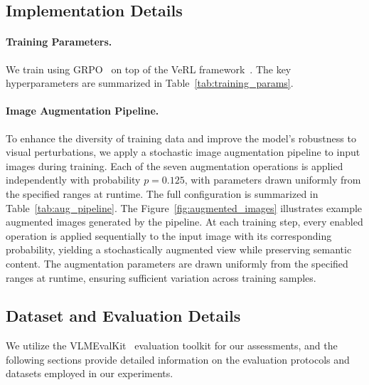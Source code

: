 

\subsection{Implementation Details}
\label{sec:implementation_details}

\paragraph{Training Parameters.}
\label{para:training_parameters}
We train \ours using GRPO~\cite{shao2024deepseekmath} on top of the VeRL framework~\cite{sheng2024hybridflow}.
The key hyperparameters are summarized in Table~\ref{tab:training_params}.



\paragraph{Image Augmentation Pipeline.}
\label{para:image_augmentation_pipeline}
To enhance the diversity of training data and improve the model's robustness to visual perturbations, we apply a stochastic image augmentation pipeline to input images during training.
Each of the seven augmentation operations is applied independently with probability $p = 0.125$, with parameters drawn uniformly from the specified ranges at runtime. The full configuration is summarized in Table~\ref{tab:aug_pipeline}.
The Figure~\ref{fig:augmented_images} illustrates example augmented images generated by the pipeline.
At each training step, every enabled operation is applied sequentially to the input image with its corresponding probability, yielding a stochastically augmented view while preserving semantic content.
The augmentation parameters are drawn uniformly from the specified ranges at runtime, ensuring sufficient variation across training samples.

\subsection{Dataset and Evaluation Details}
\label{sec:dataset_evaluation_details}
We utilize the VLMEvalKit~\cite{duan2024vlmevalkit} evaluation toolkit for our assessments, and the following sections provide detailed information on the evaluation protocols and datasets employed in our experiments.

